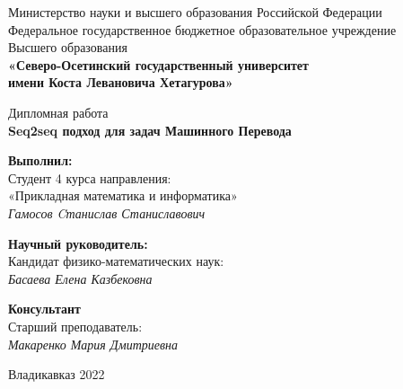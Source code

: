 \setcounter{page}{0}

\begin{center}
	\small{Министерство науки и высшего образования Российской Федерации}\\
	\small{Федеральное государственное бюджетное образовательное учреждение}\\
	\small{Высшего образования}\\
	\small{\textbf{«Северо-Осетинский государственный университет\\
			имени Коста Левановича Хетагурова»}}\\
	
	\hfill \break
	\hfill \break
	\hfill \break
	\hfill \break
	\hfill \break
	\hfill \break
	\hfill \break
	\hfill \break
	\hfill \break
	
	\normalsize{Дипломная работа}\\
	\large{\textbf{Seq2seq подход для задач Машинного Перевода}}\\
	
	\hfill \break
	\hfill \break
	\hfill \break
	\hfill \break
	\hfill \break
	\hfill\break
\end{center}

\begin{flushright}
	\textbf{Выполнил:}\\
	Студент 4 курса направления:\\
	«Прикладная математика и информатика»\\
	\textit{Гамосов Cтанислав Станиславович \underline{\hspace{3cm}}}\\
\end{flushright}

\hfill

\begin{flushright}
	\textbf{Научный руководитель:}\\
	Кандидат физико-математических наук:\\
	\textit{Басаева Елена Казбековна \underline{\hspace{3cm}}}\\
\end{flushright}

\hfill

\begin{flushright}
	\textbf{Консультант}\\
	Старший преподаватель: \\
	\textit{Макаренко Мария Дмитриевна \underline{\hspace{3cm}}}\\
\end{flushright}

\normalsize{ \hspace{28pt}} \hfill \break
\begin{center} Владикавказ 2022 \end{center}